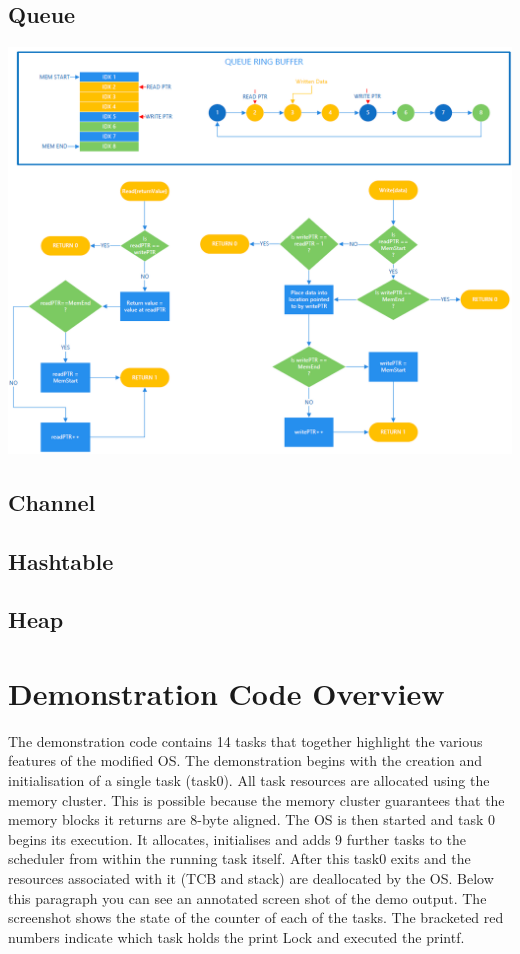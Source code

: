 \documentclass[12pt,a4paper]{article}
\begin{document}
\subsection{Queue}
\includegraphics[width=1\textwidth]{images/Queue.png}\\
\subsection{Channel}
\subsection{Hashtable}
\subsection{Heap}

\pagebreak
\section{Demonstration Code Overview}
The demonstration code contains 14 tasks that together highlight the various features of the modified OS. The demonstration begins with the creation and initialisation of a single task (task0). All task resources are allocated using the memory cluster. This is possible because the memory cluster guarantees that the memory blocks it returns are 8-byte aligned. The OS is then started and task 0 begins its execution. It allocates, initialises and adds 9 further tasks to the scheduler from within the running task itself. After this task0 exits and the resources associated with it (TCB and stack) are deallocated by the OS. Below this paragraph you can see an annotated screen shot of the demo output. The screenshot shows the state of the counter of each of the tasks. The bracketed red numbers indicate which task holds the print Lock and executed the printf.\\
\end{document}
